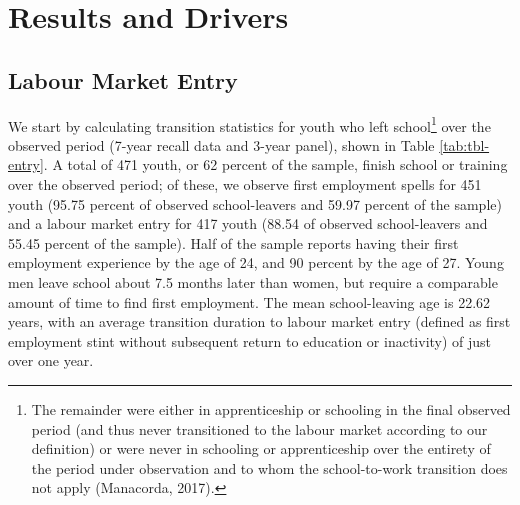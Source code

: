 \documentclass[
  a4paper, twoside, 12pt]{book}
\renewcommand{\hl}[1]{#1}
\begin{document}
\hypertarget{survey-results}{%
\section{Results and Drivers}\label{survey-results}}

\hypertarget{survey-entry}{%
\subsection{Labour Market Entry}\label{survey-entry}}

We start by calculating transition statistics for youth who left school\footnote{The remainder were either in apprenticeship or schooling in the final observed period (and thus never transitioned to the labour market according to our definition) or were never in schooling or apprenticeship over the entirety of the period under observation and to whom the school-to-work transition does not apply (Manacorda, 2017).} over the observed period (7-year recall data and 3-year panel), shown in Table \ref{tab:tbl-entry}. A total of 471 youth, or 62 percent of the sample, finish school or training over the observed period; of these, we observe first employment spells for 451 youth (95.75 percent of observed school-leavers and 59.97 percent of the sample) and a labour market entry for 417 youth (88.54 of observed school-leavers and 55.45 percent of the sample). Half of the sample reports having their first employment experience by the age of 24, and 90 percent by the age of 27. Young men leave school about 7.5 months later than women, but require a comparable amount of time to find first employment. The mean school-leaving age is 22.62 years, with an average transition duration to labour market entry \hl{(defined as first employment stint without subsequent return to education or inactivity)} of just over one year.
\end{document}
